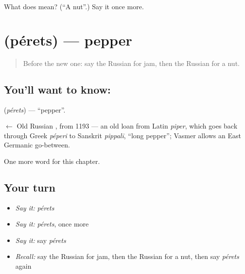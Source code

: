 \begin{tcolorbox}[breakable,colback=teal!4,colframe=teal!35!black,title={Before you move on}]
What does  mean? (\textquotedblleft{}A nut\textquotedblright{}.) Say it once more.
\end{tcolorbox}
\section[\texorpdfstring{\ru{перец} (pérets)}{перец (pérets)}]{ (pérets) — pepper}

\label{lesson:RU-C107-pepper}



\begin{quote}
Before the new one: say the Russian for jam, then the Russian for a nut.
\end{quote}

\subsection*{You'll want to know: }
\textbf{} (\emph{pérets}) — \textquotedblleft{}pepper\textquotedblright{}.

\begin{cousinweb}
\textbf{} $\leftarrow$ Old Russian \emph{}, from 1193 — an old loan from Latin \emph{piper}, which goes back through Greek \emph{péperi} to Sanskrit \emph{pippalī}, \textquotedblleft{}long pepper\textquotedblright{}; Vasmer allows an East Germanic go-between.
\end{cousinweb}

\begin{grammarlens}[title={What you've built}]
One more word for this chapter.
\end{grammarlens}

\subsection*{Your turn}
\begin{itemize}
\raggedright
  \item \emph{Say it:} \emph{pérets}
  \item \emph{Say it:} \emph{pérets}, once more
  \item \emph{Say it:} say \emph{pérets}
  \item \emph{Recall:} say the Russian for jam, then the Russian for a nut, then say \emph{pérets} again
\end{itemize}

